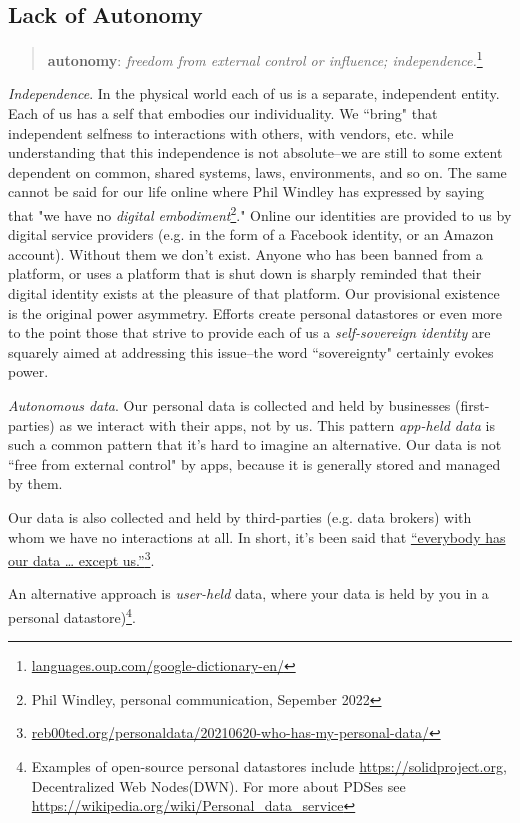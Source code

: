 \documentclass[11pt, oneside]{article}   	%
\newcommand{\hyperfootnote}[1][]{\def\ArgI{{#1}}\hyperfootnoteRelay}
\newcommand\hyperfootnoteRelay[2][]{\href{#1#2}{\ArgI}\footnote{\href{#1#2}{#2}}}
\begin{document}
\subsection{Lack of Autonomy}

\begin{quote}
\textbf{au\tiny {}\normalsize ton\tiny {}\normalsize o\tiny {}\normalsize my}: \emph{freedom from external control or influence; independence.}\hyperfootnote[][https://]{languages.oup.com/google-dictionary-en/}
\end{quote}

\emph{Independence}. In the physical world each of us is a separate, independent entity. Each of us has a self that embodies our individuality. We ``bring" that independent selfness to interactions with others, with vendors, etc. while understanding that this independence is not absolute--we are still to some extent dependent on common, shared systems, laws, environments, and so on. The same cannot be said for our life online where Phil Windley has expressed by saying that "we have no \emph{digital embodiment}\footnote{Phil Windley, personal communication, Sepember 2022}."  Online our identities are provided to us by digital service providers (e.g. in the form of a Facebook identity, or an Amazon account). Without them we don't exist. Anyone who has been banned from a platform, or uses a platform that is shut down is sharply reminded that their digital identity exists at the pleasure of that platform. Our provisional existence is the original power asymmetry. Efforts create personal datastores or even more to the point those that strive to provide each of us a \emph{self-sovereign identity}\cite{Preukschat2021} are squarely aimed at addressing this issue--the word ``sovereignty" certainly evokes power.

\emph{Autonomous data}. Our personal data is collected and held by businesses (first-parties) as we interact with their apps, not by us. This pattern \emph{app-held data} is such a common pattern that it's hard to imagine an alternative. Our data is not ``free from external control" by apps, because it is generally stored and managed by them.

Our data is also collected and held by third-parties (e.g. data brokers) with whom we have no interactions at all. In short, it's been said that \hyperfootnote[“everybody has our data … except us.”][https://]{reb00ted.org/personaldata/20210620-who-has-my-personal-data/}. 

An alternative approach is \emph{user-held} data\cite{Jurcys2021}, where your data is held by you in a personal datastore)\footnote{Examples of open-source personal datastores include \url{https://solidproject.org}, Decentralized Web Nodes(DWN). For more about PDSes see \url{https://wikipedia.org/wiki/Personal\_data\_service}}. 
\end{document}
